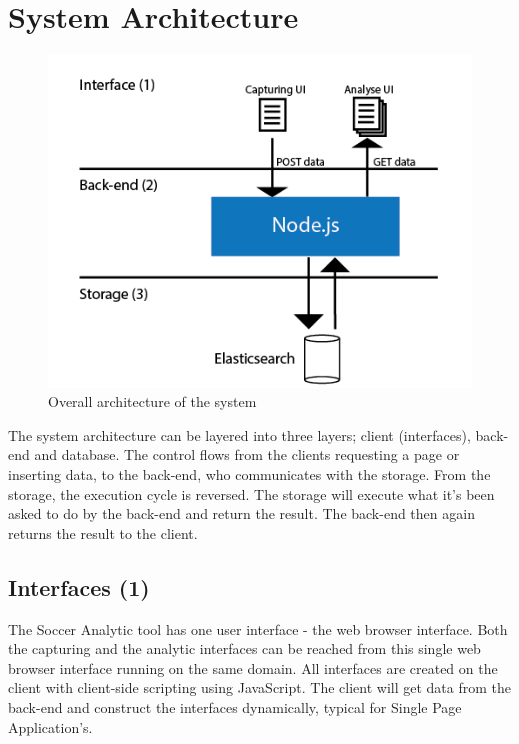 

\section{System Architecture}

\begin{figure}[ht!]
\centering
\includegraphics[width=1\textwidth]{images/architecture/architecture.png}
\caption{Overall architecture of the system }
\label{overflow}
\end{figure}

The system architecture can be layered into three layers; client (interfaces), back-end and database. The control flows from the clients requesting a page or inserting data, to the back-end, who communicates with the storage. From the storage, the execution cycle is reversed. The storage will execute what it’s been asked to do by the back-end and return the result. The back-end then again returns the result to the client.

\subsection{Interfaces (1)}

The Soccer Analytic tool has one user interface - the web browser interface. Both the capturing and the analytic interfaces can be reached from this single web browser interface running on the same domain. All interfaces are created on the client with client-side scripting using JavaScript. The client will get data from the back-end and construct the interfaces dynamically, typical for Single Page Application's\cite{SPA}.

